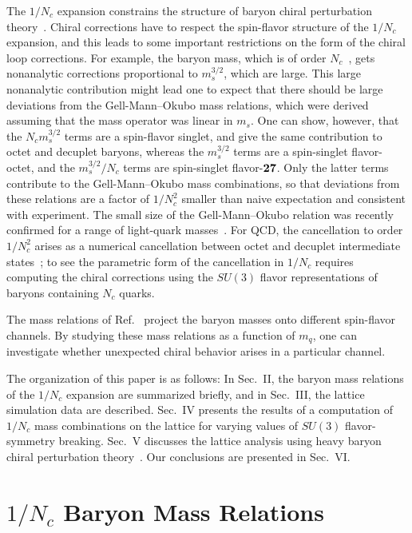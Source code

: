 \documentclass[twocolumn,nofootinbib,prd,aps,superscriptaddress,tightenlines]{revtex4}
\begin{document}
The $1/N_c$ expansion constrains the structure of baryon chiral perturbation theory~\cite{dm,djm1,djm2,flores}.  Chiral corrections have to respect the spin-flavor structure of the $1/N_c$ expansion, and this leads to some important restrictions on the form of the chiral loop corrections.  For example, the baryon mass, which is of order $N_c$~\cite{coleman,witten}, gets nonanalytic corrections proportional to $m_s^{3/2}$, which are large. This large nonanalytic contribution might lead one to expect that there should be large deviations from the Gell-Mann--Okubo mass relations, which were derived assuming that the mass operator was linear in $m_s$.  One can show, however, that the $N_c m_s^{3/2}$ terms are a spin-flavor singlet, and give the same contribution to octet and decuplet baryons, whereas the $m_s^{3/2}$ terms are a spin-singlet flavor-octet, and the $m_s^{3/2}/N_c$ terms are spin-singlet flavor-$\bf 27$.  Only the latter terms contribute to the Gell-Mann--Okubo mass combinations, so that deviations from these relations are a factor of $1/N_c^2$ smaller than naive expectation and consistent with experiment.  The small size of the Gell-Mann--Okubo relation was recently confirmed for a range of light-quark masses~\cite{Beane:2006pt}.  For QCD, the cancellation to order $1/N_c^2$ arises as a numerical cancellation between octet and decuplet intermediate states~\cite{Jenkins:1990jv}; to see the parametric form of the cancellation in $1/N_c$ requires computing the chiral corrections using the $SU(3)$ flavor representations of baryons containing $N_c$ quarks.

The mass relations of Ref.~\cite{jl} project the baryon masses onto different spin-flavor channels. By studying these mass relations as a function of $m_q$, one can investigate whether unexpected chiral behavior arises in a particular channel.

The organization of this paper is as follows:  In Sec.~II, the baryon mass relations of the $1/N_c$ expansion are summarized briefly, and in Sec.~III, the lattice simulation data are described.  Sec.~IV presents the results of a computation of $1/N_c$ mass combinations on the lattice for varying values of $SU(3)$ flavor-symmetry breaking. Sec.~V discusses the lattice analysis using heavy baryon chiral perturbation theory~\cite{Jenkins:1990jv}. Our conclusions are presented in Sec.~VI.

%
\section{$1/N_c$ Baryon Mass Relations}
\end{document}
